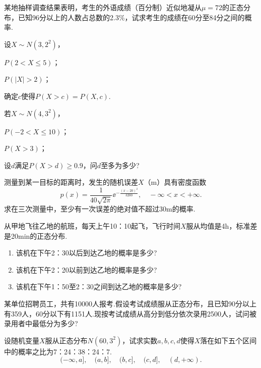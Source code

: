 \begin{xiti}
  \item 某地抽样调查结果表明，考生的外语成绩（百分制）近似地凝从$\mu=72$的正态分布，已知96分以上的人数占总数的2.3\%，试求考生的成绩在60分至84分之间的概率.

  \item 设$X\sim N(3,2^2)$，\begin{inparaenum}[(1)]
    \item $P(2<X\le5)$；\item $P(|X|>2)$；\item 确定$c$使得$P(X>c)=P(X,c)$.
    \end{inparaenum}

  \item 若$X\sim N(4,3^2)$，\begin{inparaenum}[(1)]
    \item $P(-2<X\le10)$； \item $P(X>3)$；
    \item 设$d$满足$P(X>d)\ge0.9$，问$d$至多为多少?
  \end{inparaenum}

  \item 测量到某一目标的距离时，发生的随机误差$X$（m）具有密度函数
      \[
        p(x) = \frac1{40\sqrt{2\pi}} \ee^{-\frac{(x-20)^2}{3200}},\quad -\infty < x < +\infty.
      \]
  求在三次测量中，至少有一次误差的绝对值不超过30m的概率.

  \item 从甲地飞往乙地的航班，每天上午10：10起飞，飞行时间$X$服从均值是4h，标准差是20min的正态分布.

      \begin{enumerate}
        \item 该机在下午2：30以后到达乙地的概率是多少?

        \item 该机在下午2：20以前到达乙地的概率是多少?

        \item 该机在下午1：50至2：30之间到达乙地的概率是多少?
      \end{enumerate}

  \item 某单位招聘员工，共有10000人报考.假设考试成绩服从正态分布，且已知90分以上有359人，60分以下有1151人.现按考试成绩从高分到低分依次录用2500人，试问被录用者中最低分为多少?

  \item 设随机变量$X$服从正态分布$N(60,3^2)$，试求实数$a,b,c,d$使得$X$落在如下五个区间中的概率之比为7：24：38：24：7.
      \[
        (-\infty,a],\quad (a,b],\quad (b,c],\quad (c,d],\quad (d,+\infty).
      \]


\end{xiti}
